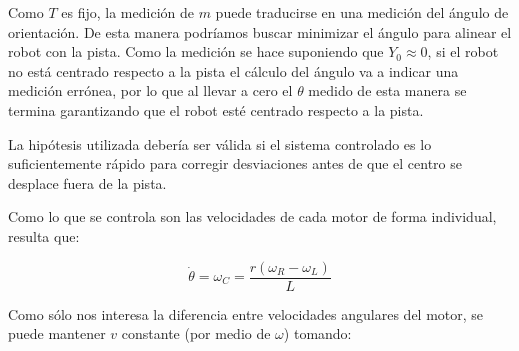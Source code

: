 \documentclass[10pt,conference,a4paper,onecolumn]{article}%
\begin{document}
%
%
%
%

Como $T$ es fijo, la medición de $m$ puede traducirse en una medición del ángulo de orientación. De esta manera podríamos buscar minimizar el ángulo para alinear el robot con la pista. Como la medición se hace suponiendo que $Y_0 \approx 0 $, si el robot no está centrado respecto a la pista el cálculo del ángulo va a indicar una medición errónea, por lo que al llevar a cero el $ \theta $ medido de esta manera se termina garantizando que el robot esté centrado respecto a la pista.

La hipótesis utilizada debería ser válida si el sistema controlado es lo suficientemente rápido para corregir desviaciones antes de que el centro se desplace fuera de la pista.

Como lo que se controla son las velocidades de cada motor de forma individual, resulta que:


\begin{equation}
\dot{\theta}=\omega_C=\frac{r(\omega _R - \omega _L)}{L}
\label{eq:tita_omega}
\end{equation}

Como sólo nos interesa la diferencia entre velocidades angulares del motor, se puede mantener $v$ constante (por medio de $\omega $) tomando:
\end{document}
